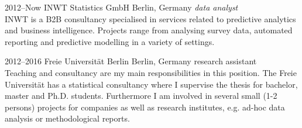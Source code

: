 \documentclass[]{friggeri-cv} %
\begin{document}
\begin{entrylist}


\entry
{2012--Now}
{INWT Statistics GmbH}
{Berlin, Germany}
{\emph{data analyst} \\ 
INWT is a B2B consultancy specialised in services related to predictive analytics and business intelligence. Projects range from analysing survey data, automated reporting and predictive modelling in a variety of settings.
}


\entry
{2012--2016}
{Freie Universit\"at Berlin}
{Berlin, Germany}
{research assistant \\
Teaching and consultancy are my main responsibilities in this position. The Freie Universit\"at has a statistical consultancy where I supervise the thesis for bachelor, master and Ph.D. students. Furthermore I am involved in several small (1-2 persons) projects for companies as well as research institutes, e.g. ad-hoc data analysis or methodological reports.}


\end{entrylist}


%
%
%
%
%
%
%
%
%
%
\end{document}
